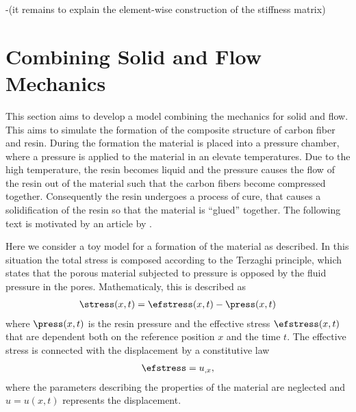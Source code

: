 \documentclass[twoside,a4paper,12pt]{article}
\newcommand{\note}[1]{{\color{red}(#1)}}
\newcommand{\note}[1]{}
\begin{document}
-\note{it remains to explain the element-wise construction of the stiffness matrix}

\section{Combining Solid and Flow Mechanics}

This section aims to develop a model combining the mechanics for solid
and flow. This aims to simulate the formation of the composite
structure of carbon fiber and resin. During the formation the material
is placed into a pressure chamber, where a pressure is applied to the
material in an elevate temperatures. Due to the high temperature, the
resin becomes liquid and the pressure causes the flow of the resin out
of the material such that the carbon fibers become compressed
together. Consequently the resin undergoes a process of cure, that
causes a solidification of the resin so that the material is ``glued''
together. The following text is motivated by an article by
\citet{Hubert1999}.

Here we consider a toy model for a formation of the material as
described.  In this situation the total stress is composed according
to the Terzaghi principle, which states that the porous material
subjected to pressure is opposed by the fluid pressure in the
pores. Mathematicaly, this is described as
%
\begin{align}
\stress(x,t) = \efstress(x,t) - \press(x,t) \label{eq:flow-stress}
\end{align}
%
where $\press(x,t)$ is the resin pressure and the effective stress
$\efstress(x,t)$ that are dependent both on the reference position $x$ and
the time $t$. The effective stress is connected with the
displacement by a constitutive law
\begin{align}
\efstress = u_{,x}, \label{eq:efstress-strain}
\end{align}
%
where the parameters describing the properties of the material are
neglected and $u= u(x,t)$ represents the displacement.
\end{document}
